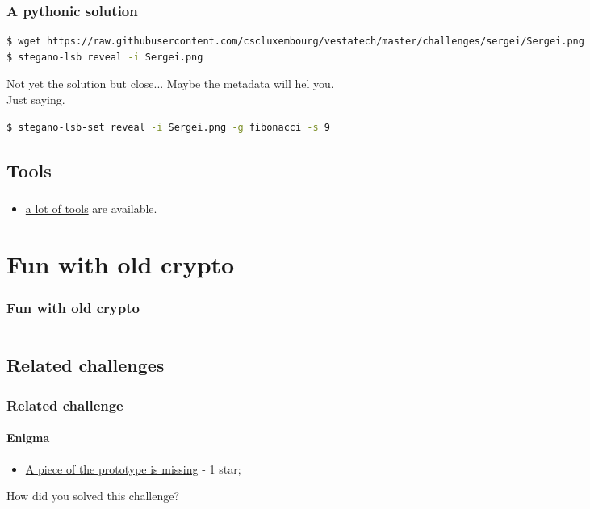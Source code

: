 \documentclass[]{beamer}
\begin{document}
\begin{frame}[fragile]
\frametitle{A pythonic solution}
\begin{lstlisting}[language=Bash]
$ wget https://raw.githubusercontent.com/cscluxembourg/vestatech/master/challenges/sergei/Sergei.png
$ stegano-lsb reveal -i Sergei.png
\end{lstlisting}
Not yet the solution but close... Maybe the metadata will hel you.\\Just saying.
\bigskip

\begin{lstlisting}[language=Bash]
$ stegano-lsb-set reveal -i Sergei.png -g fibonacci -s 9
\end{lstlisting}
\end{frame}

\subsection{Tools}
\begin{frame}
\frametitle{}
\begin{itemize}
    \item \href{https://github.com/topics/steganography}{a lot of tools} are available.
\end{itemize}
\end{frame}



%
%
\section{Fun with old crypto}
\begin{frame}
    \frametitle{Fun with old crypto}
    \begin{columns}[t]
        \begin{column}{5cm}
            \tableofcontents[sections={1-3}, currentsection, hideothersubsections]
        \end{column}
        \begin{column}{5cm}
            \tableofcontents[sections={4-5}, currentsection, hideothersubsections]
        \end{column}
    \end{columns}
\end{frame}
\subsection{Related challenges}
\begin{frame}
\frametitle{Related challenge}
\framesubtitle{Enigma}
\begin{itemize}
    \item \href{https://github.com/cscluxembourg/vestatech/tree/master/challenges/the-missing-piece}{A piece of the prototype is missing} - 1 star;
\end{itemize}
\bigskip
How did you solved this challenge?
\end{frame}
\end{document}
